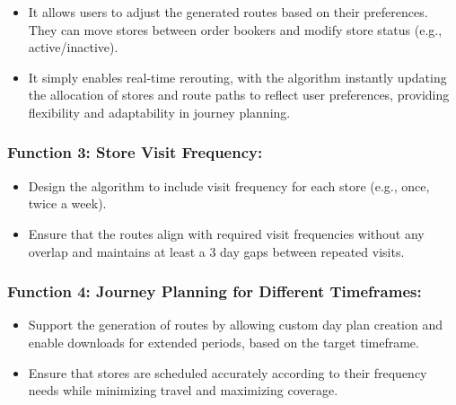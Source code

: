     \begin{itemize}
        \item It allows users to adjust the generated routes based on their preferences. They can move stores between order bookers and modify store status (e.g., active/inactive).
        \item It simply enables real-time rerouting, with the algorithm instantly updating the allocation of stores and route paths to reflect user preferences, providing flexibility and adaptability in journey planning.
    \end{itemize}

 


\subsubsection*{Function 3: Store Visit Frequency: 
}

\begin{itemize}
    \item Design the algorithm to include visit frequency for each store (e.g., once, twice a week).
    \item Ensure that the routes align with required visit frequencies without any overlap and maintains at least a 3 day gaps between repeated visits.
\end{itemize}

\subsubsection*{Function 4: Journey Planning for Different Timeframes: 
}

\begin{itemize}
    \item Support the generation of routes 
by allowing custom day plan creation and enable downloads for extended periods, based on the target timeframe.
    \item Ensure that stores are scheduled accurately according to their frequency needs while minimizing travel and maximizing coverage.
\end{itemize}



 


